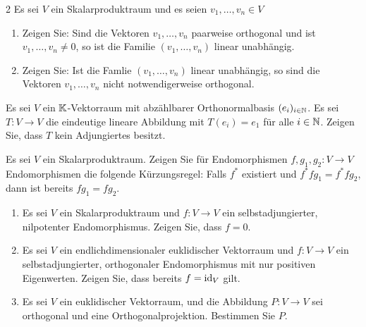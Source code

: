 

\begin{question}[subtitle = Orthogonalität und lineare Unabhängigkeit von Vektoren]{2}
  Es sei $V$ ein Skalarproduktraum und es seien $v_1, \dotsc, v_n \in V$
  \begin{enumerate}[leftmargin=*]
    \item
      Zeigen Sie:
      Sind die Vektoren $v_1, \dotsc, v_n$ paarweise orthogonal und ist $v_1, \dotsc, v_n \neq 0$, so ist die Familie $(v_1, \dotsc, v_n)$ linear unabhängig.
    \item
      Zeigen Sie:
      Ist die Famlie $(v_1, \dotsc, v_n)$ linear unabhängig, so sind die Vektoren $v_1, \dotsc, v_n$ nicht notwendigerweise orthogonal.
  \end{enumerate}
\end{question}


\begin{question}[subtitle = Ein Gegenbeispiel]{2}
  Es sei $V$ ein $\mathbb{K}$-Vektorraum mit abzählbarer Orthonormalbasis $(e_i)_{i \in \mathbb{N}}$.
  Es sei $T \colon V \to V$ die eindeutige lineare Abbildung mit $T(e_i) = e_1$ für alle $i \in \mathbb{N}$.
  Zeigen Sie, dass $T$ kein Adjungiertes besitzt.
\end{question}


\begin{question}[subtitle = Eine Kürzungsregel]{2}
  Es sei $V$ ein Skalarproduktraum.
  Zeigen Sie für Endomorphismen $f, g_1, g_2 \colon V \to V$ Endomorphismen die folgende Kürzungsregel:
  Falls $f^*$ existiert und $f^* f g_1 = f^* f g_2$, dann ist bereits $f g_1 = f g_2$.
\end{question}


\begin{question}[subtitle = Bestimmung von Abbildungen]{2}
  \begin{enumerate}
    \item
      Es sei $V$ ein Skalarproduktraum und $f \colon V \to V$ ein selbstadjungierter, nilpotenter Endomorphismus.
      Zeigen Sie, dass $f = 0$.
    \item
      Es sei $V$ ein endlichdimensionaler euklidischer Vektorraum und $f \colon V \to V$ ein selbstadjungierter, orthogonaler Endomorphismus mit nur positiven Eigenwerten.
      Zeigen Sie, dass bereits $f = \operatorname{id}_V$ gilt.
    \item
        Es sei $V$ ein euklidischer Vektorraum, und die Abbildung $P \colon V \to V$ sei orthogonal und eine Orthogonalprojektion.
        Bestimmen Sie $P$.
  \end{enumerate}
\end{question}


